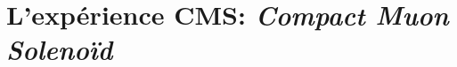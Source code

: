 \section{L'expérience CMS: \emph{Compact Muon Solenoïd}}\label{chapter-LHC-section-CMS}

\newpage


\newpage



